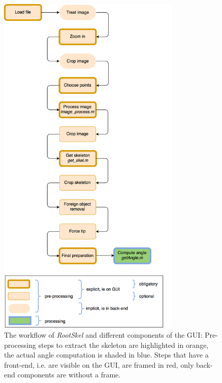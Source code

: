 
\begin{figure}[H]
	\centering
	\includegraphics[width=0.78\textwidth]{../Figures/workflow_big.png}
	\caption{The workflow of \textit{RootSkel} and different components of the GUI: Pre-processing steps to extract the skeleton are highlighted in orange, the actual angle computation is shaded in blue. Steps that have a front-end, i.e. are visible on the GUI, are framed in red, only back-end components are without a frame. }
	\label{fig:workflow}
\end{figure}


